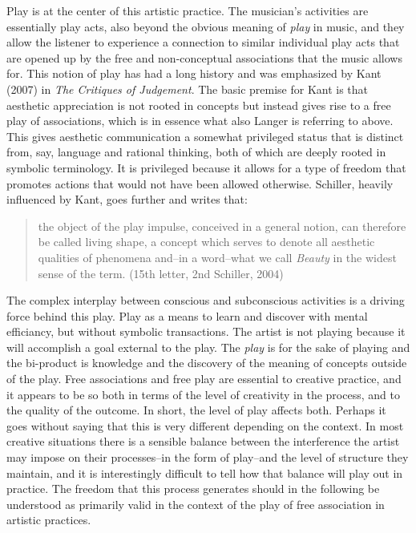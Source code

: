 \documentclass[11pt]{article}
\makeatletter
\newcommand{\cslcitation}[2]
 {\protect\hyper@linkstart{cite}{citeproc_bib_item_#1}#2\hyper@linkend}
\makeatother
\begin{document}
Play is at the center of this artistic practice. The musician's activities are essentially play acts, also beyond the obvious meaning of \emph{play} in music, and they allow the listener to experience a connection to similar individual play acts that are opened up by the free and non-conceptual associations that the music allows for. This notion of play has had a long history and was emphasized by Kant (\cslcitation{13}{2007}) in \emph{The Critiques of Judgement}. The basic premise for Kant is that aesthetic appreciation is not rooted in concepts but instead gives rise to a free play of associations, which is in essence what also Langer is referring to above. This gives aesthetic communication a somewhat privileged status that is distinct from, say, language and rational thinking, both of which are deeply rooted in symbolic terminology. It is privileged because it allows for a type of freedom that promotes actions that would not have been allowed otherwise.
Schiller, heavily influenced by Kant, goes further and writes that:
\begin{quote}
the object of the play impulse, conceived in a general notion, can therefore be called living shape, a concept which serves to denote all aesthetic qualities of phenomena and--in a word--what we call \emph{Beauty} in the widest sense of the term. (15th letter, 2nd \cslcitation{19}{Schiller, 2004})
\end{quote}

The complex interplay between conscious and subconscious activities is a driving force behind this play. Play as a means to learn and discover with mental efficiancy, but without symbolic transactions. The artist is not playing because it will accomplish a goal external to the play. The \emph{play} is for the sake of playing and the bi-product is knowledge and the discovery of the meaning of concepts outside of the play. Free associations and free play are essential to creative practice, and it appears to be so both in terms of the level of creativity in the process, and to the quality of the outcome. In short, the level of play affects both. Perhaps it goes without saying that this is very different depending on the context. In most creative situations there is a sensible balance between the interference the artist may impose on their processes--in the form of play--and the level of structure they maintain, and it is interestingly difficult to tell how that balance will play out in practice.
The freedom that this process generates should in the following be understood as primarily valid in the context of the play of free association in artistic practices.
\end{document}
